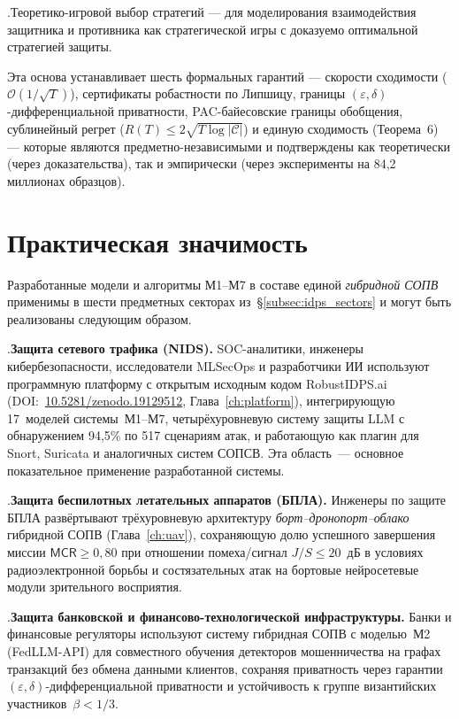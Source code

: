 .\quad Теоретико-игровой выбор стратегий --- для моделирования взаимодействия защитника и противника как стратегической игры с доказуемо оптимальной стратегией защиты.

Эта основа устанавливает шесть формальных гарантий --- скорости сходимости ($\mathcal{O}(1/\sqrt{T})$), сертификаты робастности по Липшицу, границы $(\varepsilon,\delta)$-дифференциальной приватности, PAC-байесовские границы обобщения, сублинейный регрет ($R(T)\leq 2\sqrt{T\log|\mathcal{C}|}$) и единую сходимость (Теорема~6) --- которые являются предметно-независимыми и подтверждены как теоретически (через доказательства), так и эмпирически (через эксперименты на 84,2 миллионах образцов).

\section*{Практическая значимость}

Разработанные модели и алгоритмы М1--М7 в составе единой
\emph{гибридной СОПВ} применимы в шести предметных секторах
из~\S\ref{subsec:idps_sectors} и могут быть реализованы следующим
образом.

.\quad \textbf{Защита сетевого трафика (NIDS).} SOC-аналитики,
инженеры кибербезопасности, исследователи MLSecOps и разработчики
ИИ используют программную платформу с открытым исходным кодом
\textsf{RobustIDPS.ai} (DOI:~\url{10.5281/zenodo.19129512},
Глава~\ref{ch:platform}), интегрирующую 17~моделей системы~М1--М7,
четырёхуровневую систему защиты LLM с обнаружением 94{,}5\% по 517
сценариям атак, и работающую как плагин для Snort, Suricata и
аналогичных систем СОПСВ. Эта область~--- основное показательное
применение разработанной системы.

.\quad \textbf{Защита беспилотных летательных аппаратов
(БПЛА).} Инженеры по защите БПЛА развёртывают трёхуровневую
архитектуру \emph{борт--дронопорт--облако} гибридной СОПВ
(Глава~\ref{ch:uav}), сохраняющую долю успешного завершения миссии
$\textsf{MCR}\ge 0{,}80$ при отношении помеха/сигнал $J/S\le 20$~дБ
в условиях радиоэлектронной борьбы и состязательных атак на бортовые
нейросетевые модули зрительного восприятия.

.\quad \textbf{Защита банковской и финансово-технологической
инфраструктуры.} Банки и финансовые регуляторы используют систему
гибридная СОПВ с моделью~М2 (FedLLM-API) для совместного обучения
детекторов мошенничества на графах транзакций без обмена данными
клиентов, сохраняя приватность через гарантии
$(\varepsilon,\delta)$-дифференциальной приватности и
устойчивость к группе византийских участников~$\beta<1/3$.

